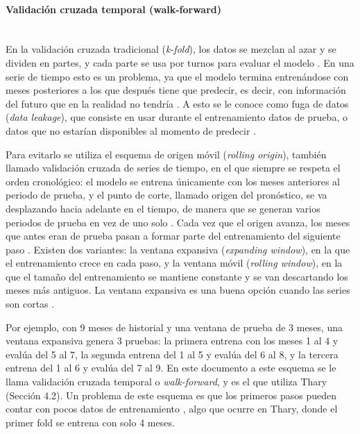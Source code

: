 \paragraph{Validación cruzada temporal (walk-forward)}\mbox{}\\
En la validación cruzada tradicional (\textit{k-fold}), los datos se mezclan al azar y se dividen en partes, y cada parte se usa por turnos para evaluar el modelo \cite{hewamalage2023evaluation}. En una serie de tiempo esto es un problema, ya que el modelo termina entrenándose con meses posteriores a los que después tiene que predecir, es decir, con información del futuro que en la realidad no tendría \cite{hewamalage2023evaluation}. A esto se le conoce como fuga de datos (\textit{data leakage}), que consiste en usar durante el entrenamiento datos de prueba, o datos que no estarían disponibles al momento de predecir \cite{hewamalage2023evaluation}.

Para evitarlo se utiliza el esquema de origen móvil (\textit{rolling origin}), también llamado validación cruzada de series de tiempo, en el que siempre se respeta el orden cronológico: el modelo se entrena únicamente con los meses anteriores al periodo de prueba, y el punto de corte, llamado origen del pronóstico, se va desplazando hacia adelante en el tiempo, de manera que se generan varios periodos de prueba en vez de uno solo \cite{hewamalage2023evaluation}. Cada vez que el origen avanza, los meses que antes eran de prueba pasan a formar parte del entrenamiento del siguiente paso \cite{hewamalage2023evaluation}. Existen dos variantes: la ventana expansiva (\textit{expanding window}), en la que el entrenamiento crece en cada paso, y la ventana móvil (\textit{rolling window}), en la que el tamaño del entrenamiento se mantiene constante y se van descartando los meses más antiguos. La ventana expansiva es una buena opción cuando las series son cortas \cite{hewamalage2023evaluation}.

Por ejemplo, con 9 meses de historial y una ventana de prueba de 3 meses, una ventana expansiva genera 3 pruebas: la primera entrena con los meses 1 al 4 y evalúa del 5 al 7, la segunda entrena del 1 al 5 y evalúa del 6 al 8, y la tercera entrena del 1 al 6 y evalúa del 7 al 9. En este documento a este esquema se le llama validación cruzada temporal o \textit{walk-forward}, y es el que utiliza Thary (Sección 4.2). Un problema de este esquema es que los primeros pasos pueden contar con pocos datos de entrenamiento \cite{hewamalage2023evaluation}, algo que ocurre en Thary, donde el primer fold se entrena con solo 4 meses.

